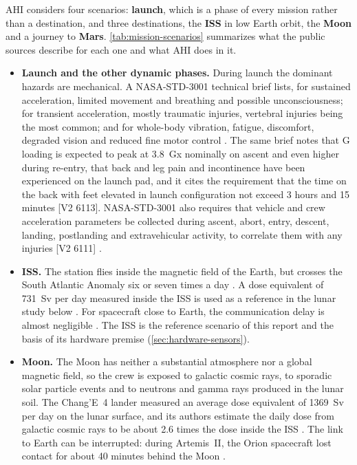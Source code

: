AHI considers four scenarios: \textbf{launch}, which is a phase of every mission rather than a destination, and three destinations, the \textbf{ISS} in low Earth orbit, the \textbf{Moon} and a journey to \textbf{Mars}. \ref{tab:mission-scenarios} summarizes what the public sources describe for each one and what AHI does in it.

\begin{itemize}
\item \textbf{Launch and the other dynamic phases.} During launch the dominant hazards are mechanical. A NASA-STD-3001 technical brief lists, for sustained acceleration, limited movement and breathing and possible unconsciousness; for transient acceleration, mostly traumatic injuries, vertebral injuries being the most common; and for whole-body vibration, fatigue, discomfort, degraded vision and reduced fine motor control \cite{nasa_ochmo_tb024_occupant}. The same brief notes that G loading is expected to peak at 3.8~Gx nominally on ascent and even higher during re-entry, that back and leg pain and incontinence have been experienced on the launch pad, and it cites the requirement that the time on the back with feet elevated in launch configuration not exceed 3 hours and 15 minutes [V2 6113]. NASA-STD-3001 also requires that vehicle and crew acceleration parameters be collected during ascent, abort, entry, descent, landing, postlanding and extravehicular activity, to correlate them with any injuries [V2 6111] \cite{nasa_ochmo_tb024_occupant}.
\item \textbf{ISS.} The station flies inside the magnetic field of the Earth, but crosses the South Atlantic Anomaly six or seven times a day \cite{nasa_srag_space_radiation}. A dose equivalent of 731~\textmu Sv per day measured inside the ISS is used as a reference in the lunar study below \cite{zhang2020lunar}. For spacecraft close to Earth, the communication delay is almost negligible \cite{nasa_space_communications_seven_things}. The ISS is the reference scenario of this report and the basis of its hardware premise (\ref{sec:hardware-sensors}).
\item \textbf{Moon.} The Moon has neither a substantial atmosphere nor a global magnetic field, so the crew is exposed to galactic cosmic rays, to sporadic solar particle events and to neutrons and gamma rays produced in the lunar soil. The Chang'E~4 lander measured an average dose equivalent of 1369~\textmu Sv per day on the lunar surface, and its authors estimate the daily dose from galactic cosmic rays to be about 2.6 times the dose inside the ISS \cite{zhang2020lunar}. The link to Earth can be interrupted: during Artemis~II, the Orion spacecraft lost contact for about 40 minutes behind the Moon \cite{ctv_artemis2_blackout}.

\end{itemize}
